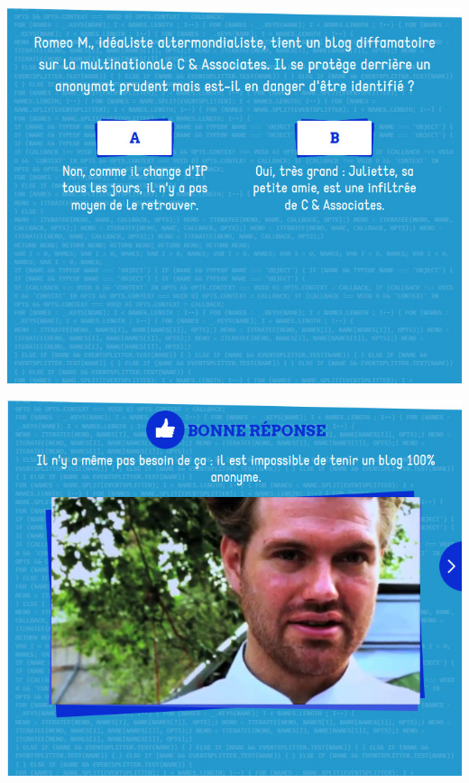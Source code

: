 \documentclass{beamer}
\begin{document}
\begin{frame}\includegraphics[scale=0.6] {./images/Quizz_HygieneNumerique_France4_38.jpg} \end{frame}
\begin{frame}\includegraphics[scale=0.6] {./images/Quizz_HygieneNumerique_France4_39.jpg} \end{frame}
\end{document}
